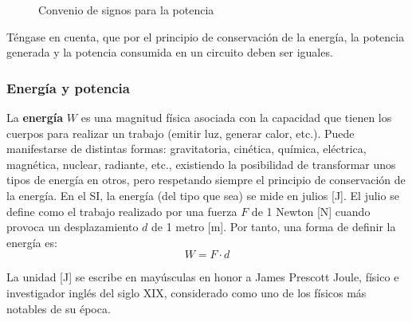 	\begin{figure}[H]
          \centering
          \hfil
          \caption{Convenio de signos para la potencia}
          \label{fig:receptor_generador}
	\end{figure}
	
	\begin{remark}
          Téngase en cuenta, que por el principio de conservación de
          la energía, la potencia generada y la potencia consumida en
          un circuito deben ser iguales.
	\end{remark}
	
	\subsubsection{Energía y potencia}
	
	La \textbf{energía} $W$ es una magnitud física asociada con la
        capacidad que tienen los cuerpos para realizar un trabajo
        (emitir luz, generar calor, etc.). Puede manifestarse de
        distintas formas: gravitatoria, cinética, química, eléctrica,
        magnética, nuclear, radiante, etc., existiendo la posibilidad
        de transformar unos tipos de energía en otros, pero respetando
        siempre el principio de conservación de la energía. En el SI,
        la energía (del tipo que sea) se mide en julios [J]. El julio
        se define como el trabajo realizado por una fuerza $F$ de 1
        Newton [N] cuando provoca un desplazamiento $d$ de 1 metro
        [m]. Por tanto, una forma de definir la energía es:
	\begin{equation*}
          W=F\cdot d 
	\end{equation*}
	\begin{remark}
          La unidad [J] se escribe en mayúsculas en honor a James
          Prescott Joule, físico e investigador inglés del siglo XIX,
          considerado como uno de los físicos más notables de su
          época.
	\end{remark}
	
